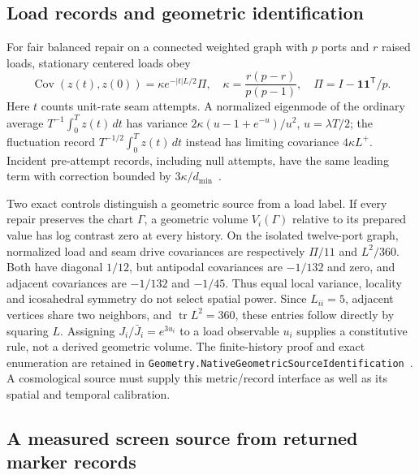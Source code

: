 \documentclass[11pt]{article}
\theoremstyle{remark}
\begin{document}
\subsection{Load records and geometric identification}
\label{subsec:native-cosmology-source-boundary}
\label{subsec:native-geometric-source-identification}
For fair balanced repair on a connected weighted graph with \(p\) ports
and \(r\) raised loads, stationary centered loads obey
\[
 \operatorname{Cov}(z(t),z(0))=\kappa e^{-|t|L/2}\Pi,
 \quad \kappa=\frac{r(p-r)}{p(p-1)},\quad
 \Pi=I-\mathbf1\mathbf1^{\mathsf T}/p.
\]
Here \(t\) counts unit-rate seam attempts. A normalized eigenmode of the
ordinary average \(T^{-1}\int_0^Tz(t)\,dt\) has variance
\(2\kappa(u-1+e^{-u})/u^2\), \(u=\lambda T/2\); the fluctuation record
\(T^{-1/2}\int_0^Tz(t)\,dt\) instead has limiting covariance
\(4\kappa L^+\). Incident pre-attempt records, including null attempts,
have the same leading term with correction bounded by
\(3\kappa/d_{\min}\)~\cite{ophmicro}.

Two exact controls distinguish a geometric source from a load label.
If every repair preserves the chart \(\Gamma\), a geometric volume
\(V_i(\Gamma)\) relative to its prepared value has log contrast zero at
every history. On the isolated twelve-port graph, normalized load and seam
drive covariances are respectively \(\Pi/11\) and \(L^2/360\).
Both have diagonal \(1/12\), but antipodal covariances are \(-1/132\)
and zero, and adjacent covariances are \(-1/132\) and \(-1/45\).
Thus equal local variance, locality and icosahedral symmetry do not select
spatial power. Since \(L_{ii}=5\), adjacent vertices share two neighbors,
and \(\operatorname{tr}L^2=360\), these entries follow directly by
squaring \(L\). Assigning \(J_i/\bar J_i=e^{3u_i}\) to a load observable
\(u_i\) supplies a constitutive rule, not a derived geometric volume.
The finite-history proof and exact enumeration are retained in
\texttt{Geometry.NativeGeometricSourceIdentification}~\cite{ophlean}.
A cosmological source must supply this metric/record interface as well as
its spatial and temporal calibration.

\subsection{A measured screen source from returned marker records}
\end{document}
